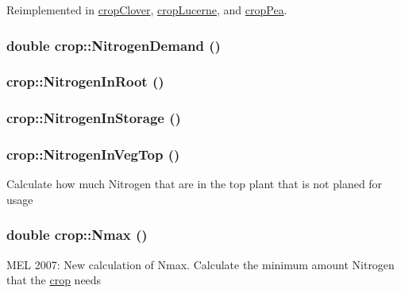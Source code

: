 Reimplemented in \hyperlink{classcrop_clover_a93d5dff1cdb5018b42f38cac6dc1de13}{cropClover}, \hyperlink{classcrop_lucerne_a021d6c3c1d6951936e97d1a7e900331a}{cropLucerne}, and \hyperlink{classcrop_pea_a2e984c9df88d272f2caade355a36fff7}{cropPea}.\hypertarget{classcrop_a7f8a309f89bee5db02055897d0a717be}{
\subsubsection[{NitrogenDemand}]{\setlength{\rightskip}{0pt plus 5cm}double crop::NitrogenDemand ()}}
\label{classcrop_a7f8a309f89bee5db02055897d0a717be}
\hypertarget{classcrop_ad0404629e0ae80c88ae7b99ff50cfdca}{
\subsubsection[{NitrogenInRoot}]{ crop::NitrogenInRoot ()}}
\label{classcrop_ad0404629e0ae80c88ae7b99ff50cfdca}
\hypertarget{classcrop_a4f4f31c68a905ef3fef26b9d7456cb36}{
\subsubsection[{NitrogenInStorage}]{ crop::NitrogenInStorage ()}}
\label{classcrop_a4f4f31c68a905ef3fef26b9d7456cb36}
\hypertarget{classcrop_a82bef6e98553aa173173b0ea454a3e0a}{
\subsubsection[{NitrogenInVegTop}]{ crop::NitrogenInVegTop ()}}
\label{classcrop_a82bef6e98553aa173173b0ea454a3e0a}
Calculate how much Nitrogen that are in the top plant that is not planed for usage \hypertarget{classcrop_a6416f0baf1364f2cf28f312584c39f73}{
\subsubsection[{Nmax}]{\setlength{\rightskip}{0pt plus 5cm}double crop::Nmax ()}}
\label{classcrop_a6416f0baf1364f2cf28f312584c39f73}
MEL 2007: New calculation of Nmax. Calculate the minimum amount Nitrogen that the \hyperlink{classcrop}{crop} needs 

